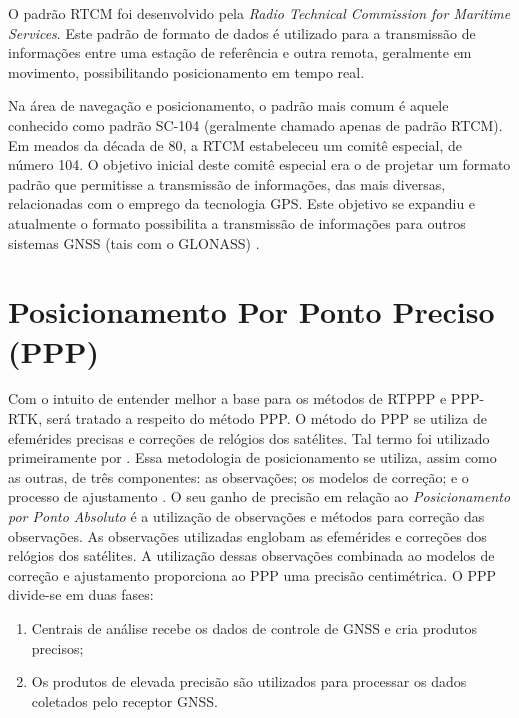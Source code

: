 O padrão RTCM foi desenvolvido pela \textit{Radio Technical Commission for Maritime Services}. Este padrão de formato de dados é utilizado para a transmissão de informações entre uma estação de referência e outra remota, geralmente em movimento, possibilitando posicionamento em tempo real.

Na área de navegação e posicionamento, o padrão mais comum é aquele conhecido como padrão SC-104 (geralmente chamado apenas de padrão RTCM). Em meados da década de 80, a RTCM estabeleceu um comitê especial, de número 104. O objetivo inicial deste comitê especial era o de projetar um formato padrão que permitisse a transmissão de informações, das mais diversas, relacionadas com o emprego da tecnologia GPS. Este objetivo se expandiu e atualmente o formato possibilita a transmissão de informações para outros sistemas GNSS (tais com o GLONASS) \citep{Navipedia2019}.


\section{Posicionamento Por Ponto Preciso (PPP)}
\noindent

Com o intuito de entender melhor a base para os métodos de RTPPP e PPP-RTK, será tratado a respeito do método PPP. O método do PPP se utiliza  de efemérides precisas e correções de relógios dos satélites. Tal termo foi utilizado primeiramente por \cite{heroux1995gps}. Essa metodologia de posicionamento se utiliza, assim como as outras, de três componentes: as observações; os modelos de correção; e o processo de ajustamento \citep{cunha2016_PPP}. O seu ganho de precisão em relação ao \textit{Posicionamento por Ponto Absoluto} é a utilização de observações e métodos para correção das observações. As observações utilizadas englobam as efemérides e correções dos relógios dos satélites. A utilização dessas observações combinada ao modelos de correção e ajustamento proporciona ao PPP uma precisão centimétrica. O PPP divide-se em duas fases:

\begin{enumerate}
    \item Centrais de análise recebe os dados de controle de GNSS e cria produtos precisos;
    \item Os produtos de elevada precisão são utilizados para processar os dados coletados pelo receptor GNSS.
\end{enumerate}

